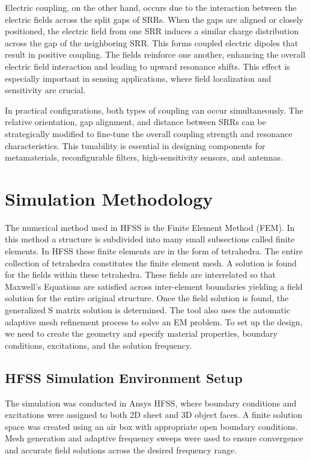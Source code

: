 \documentclass[conference]{IEEEtran}
\begin{document}
Electric coupling, on the other hand, occurs due to the interaction between the electric fields across the split gaps of SRRs. When the gaps are aligned or closely positioned, the electric field from one SRR induces a similar charge distribution across the gap of the neighboring SRR. This forms coupled electric dipoles that result in positive coupling. The fields reinforce one another, enhancing the overall electric field interaction and leading to upward resonance shifts. This effect is especially important in sensing applications, where field localization and sensitivity are crucial.

In practical configurations, both types of coupling can occur simultaneously. The relative orientation, gap alignment, and distance between SRRs can be strategically modified to fine-tune the overall coupling strength and resonance characteristics. This tunability is essential in designing components for metamaterials, reconfigurable filters, high-sensitivity sensors, and antennas.

\section{Simulation Methodology}
The numerical method used in HFSS is the Finite Element Method (FEM). In this method a structure is subdivided into many small subsections called finite elements. In HFSS these finite elements are in the form of tetrahedra. The entire collection of tetrahedra constitutes the finite element mesh. A solution is found for the fields within these tetrahedra. These fields are
interrelated so that Maxwell’s Equations are satisfied across inter-element boundaries yielding a field solution for the entire original structure. Once the field solution is found, the generalized S matrix solution is determined.
The tool also uses the automatic adaptive mesh refinement process to solve an EM problem. To set up the design, we need to create the geometry and specify material properties, boundary conditions, excitations, and the solution frequency.


\subsection{HFSS Simulation Environment Setup}
The simulation was conducted in Ansys HFSS, where boundary conditions and excitations were assigned to both 2D sheet and 3D object faces. A finite solution space was created using an air box with appropriate open boundary conditions. Mesh generation and adaptive frequency sweeps were used to ensure convergence and accurate field solutions across the desired frequency range.
\end{document}
